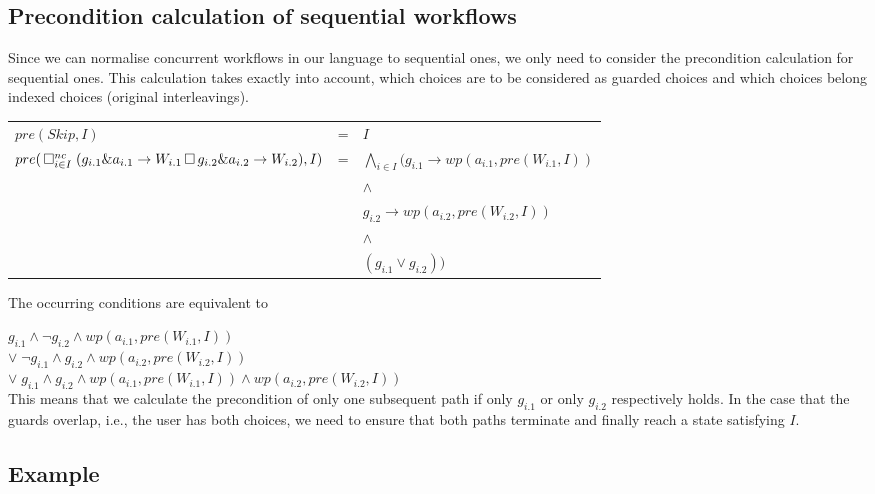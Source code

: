\documentclass[11pt]{article}
\begin{document}
\subsection{Precondition calculation of sequential workflows}

Since we can normalise concurrent workflows in our language to sequential ones, we only need to consider the precondition calculation for sequential ones. This calculation takes exactly into account, which choices are to be considered as guarded choices and which choices belong indexed choices (original interleavings).

\noindent
\begin{tabular}{l c l}
	$pre(Skip,I)$ & = & $I$ \\
	$pre(\, \Box^{nc}_{i \in I} \; (g_{i.1} \& a_{i.1} \rightarrow W_{i.1} 
                                                \, \Box \, g_{i.2} \& a_{i.2} \rightarrow W_{i.2}),I)$ &=& $\bigwedge_{i \in I} (g_{i.1} \longrightarrow wp(a_{i.1},pre(W_{i.1},I))$ \\ 
&& \hspace*{27pt} $\land$ \\
&& \hspace*{24pt}        $g_{i.2} \longrightarrow wp(a_{i.2},pre(W_{i.2},I))$ \\
&& \hspace*{27pt} $\land$ \\
&& \hspace*{24pt}        $(g_{i.1} \lor g_{i.2}))$
\end{tabular}

The occurring conditions are equivalent to 

\noindent
\hspace*{7pt} $g_{i.1} \land \lnot g_{i.2} \land wp(a_{i.1},pre(W_{i.1},I))$ \\
$\lor \; \lnot g_{i.1} \land g_{i.2} \land wp(a_{i.2},pre(W_{i.2},I))$ \\
$\lor \; g_{i.1} \land g_{i.2} \land wp(a_{i.1},pre(W_{i.1},I)) \land wp(a_{i.2},pre(W_{i.2},I))$ \\

This means that we calculate the precondition of only one subsequent path if only $g_{i.1}$ or only $g_{i.2}$ respectively holds. In the case that the guards overlap, i.e., the user has both choices, we need to ensure that both paths terminate and finally reach a state satisfying $I$.

\subsection{Example}
\end{document}
